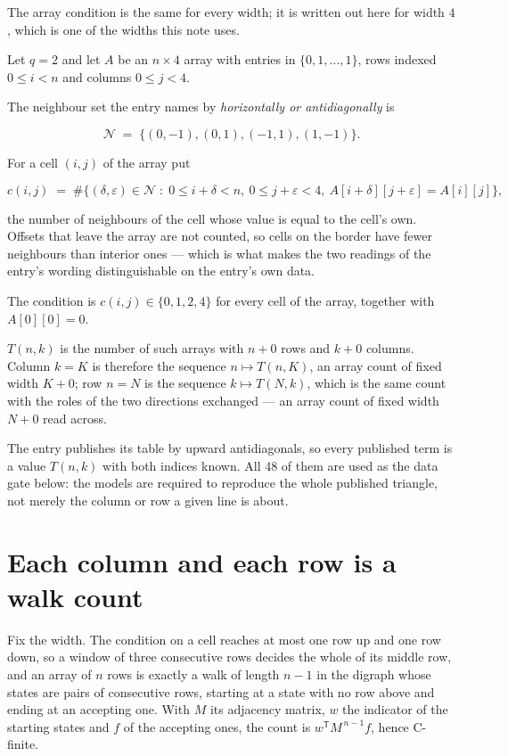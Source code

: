 \documentclass[11pt]{article}
\theoremstyle{definition}
\begin{document}
The array condition is the same for every width; it is written out here for width $4$, which is one of the widths this note uses.

Let $q = 2$ and let $A$ be an $n \times 4$ array with entries in $\{0,1,\dots,1\}$, rows indexed $0 \le i < n$ and columns $0 \le j < 4$.

The neighbour set the entry names by {\itshape horizontally or antidiagonally} is

\[\mathcal{N} \;=\; \{(0,-1), (0,1), (-1,1), (1,-1)\}.\]

For a cell $(i,j)$ of the array put

\[c(i,j) \;=\; \#\bigl\{(\delta,\varepsilon)\in\mathcal{N} \;:\; 0\le i+\delta<n,\ 0\le j+\varepsilon<4,\ A[i+\delta][j+\varepsilon] = A[i][j]\bigr\},\]

the number of neighbours of the cell whose value is equal to the cell's own. Offsets that leave the array are not counted, so cells on the border have fewer neighbours than interior ones --- which is what makes the two readings of the entry's wording distinguishable on the entry's own data.

The condition is $c(i,j) \in \{0, 1, 2, 4\}$ for every cell of the array, together with $A[0][0]=0$.

$T(n,k)$ is the number of such arrays with $n + 0$ rows and $k + 0$ columns. Column $k = K$ is therefore the sequence $n \mapsto T(n,K)$, an array count of fixed width $K + 0$; row $n = N$ is the sequence $k \mapsto T(N,k)$, which is the same count with the roles of the two directions exchanged --- an array count of fixed width $N + 0$ read across.

The entry publishes its table by upward antidiagonals, so every published term is a value $T(n,k)$ with both indices known. All 48 of them are used as the data gate below: the models are required to reproduce the whole published triangle, not merely the column or row a given line is about.

\section{Each column and each row is a walk count}

Fix the width. The condition on a cell reaches at most one row up and one row down, so a window of three consecutive rows decides the whole of its middle row, and an array of $n$ rows is exactly a walk of length $n-1$ in the digraph whose states are pairs of consecutive rows, starting at a state with no row above and ending at an accepting one. With $M$ its adjacency matrix, $w$ the indicator of the starting states and $f$ of the accepting ones, the count is $w^{\mathsf T}M^{\,n-1}f$, hence C-finite.
\end{document}
